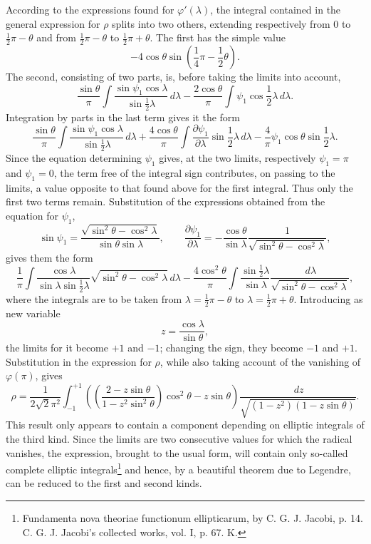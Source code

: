 \documentclass[11pt]{article}
\newcommand{\dd}{\,d}
\begin{document}
According to the expressions found for $\varphi'(\lambda)$, the integral contained in the general expression for $\rho$ splits into two others, extending respectively from $0$ to $\frac12\pi-\theta$ and from $\frac12\pi-\theta$ to $\frac12\pi+\theta$. The first has the simple value
\[
 -4\cos\theta\sin\left(\frac14\pi-\frac12\theta\right).
\]
The second, consisting of two parts, is, before taking the limits into account,
\[
 \frac{\sin\theta}{\pi}\int\frac{\sin\psi_1\cos\lambda}{\sin\frac12\lambda}\dd\lambda
 -\frac{2\cos\theta}{\pi}\int\psi_1\cos\frac12\lambda\dd\lambda.
\]
Integration by parts in the last term gives it the form
\[
 \frac{\sin\theta}{\pi}\int\frac{\sin\psi_1\cos\lambda}{\sin\frac12\lambda}\dd\lambda
 +\frac{4\cos\theta}{\pi}\int\frac{\partial\psi_1}{\partial\lambda}\sin\frac12\lambda\dd\lambda
 -\frac4\pi\psi_1\cos\theta\sin\frac12\lambda.
\]
Since the equation determining $\psi_1$ gives, at the two limits, respectively $\psi_1=\pi$ and $\psi_1=0$, the term free of the integral sign contributes, on passing to the limits, a value opposite to that found above for the first integral. Thus only the first two terms remain. Substitution of the expressions obtained from the equation for $\psi_1$,
\[
 \sin\psi_1=\frac{\sqrt{\sin^2\theta-\cos^2\lambda}}{\sin\theta\sin\lambda},
\qquad
 \frac{\partial\psi_1}{\partial\lambda}=-\frac{\cos\theta}{\sin\lambda}\frac1{\sqrt{\sin^2\theta-\cos^2\lambda}},
\]
gives them the form
\[
 \frac1\pi\int\frac{\cos\lambda}{\sin\lambda\sin\frac12\lambda}\sqrt{\sin^2\theta-\cos^2\lambda}\dd\lambda
 -\frac{4\cos^2\theta}{\pi}\int\frac{\sin\frac12\lambda}{\sin\lambda}\frac{\dd\lambda}{\sqrt{\sin^2\theta-\cos^2\lambda}},
\]
where the integrals are to be taken from $\lambda=\frac12\pi-\theta$ to $\lambda=\frac12\pi+\theta$. Introducing as new variable
\[
 z=\frac{\cos\lambda}{\sin\theta},
\]
the limits for it become $+1$ and $-1$; changing the sign, they become $-1$ and $+1$. Substitution in the expression for $\rho$, while also taking account of the vanishing of $\varphi(\pi)$, gives
\[
 \rho=\frac{1}{2\sqrt2\pi^2}\int_{-1}^{+1}\left(\left(\frac{2-z\sin\theta}{1-z^2\sin^2\theta}\right)\cos^2\theta-z\sin\theta\right)
 \frac{\dd z}{\sqrt{(1-z^2)(1-z\sin\theta)}}.
\]
This result only appears to contain a component depending on elliptic integrals of the third kind. Since the limits are two consecutive values for which the radical vanishes, the expression, brought to the usual form, will contain only so-called complete elliptic integrals\footnote{Fundamenta nova theoriae functionum ellipticarum, by C. G. J. Jacobi, p. 14. C. G. J. Jacobi's collected works, vol. I, p. 67. K.} and hence, by a beautiful theorem due to Legendre, can be reduced to the first and second kinds.
\end{document}
